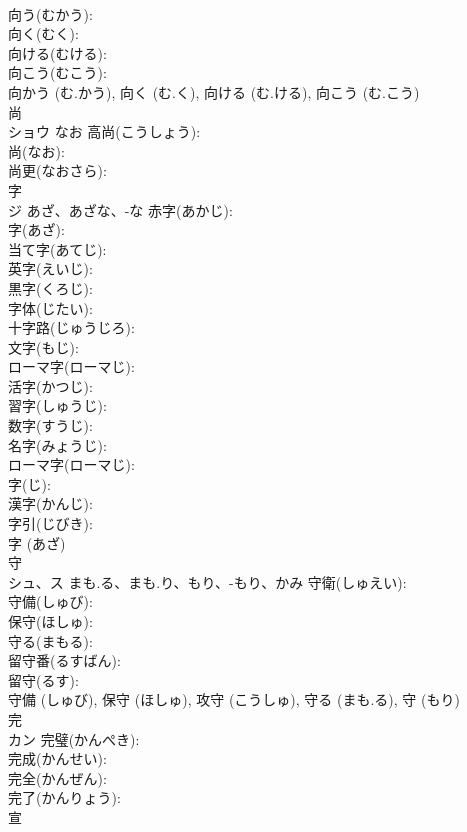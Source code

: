 \documentclass[8pt]{extreport}
\begin{document}
\begin{CJK}{UTF8}{min}
\\	向う(むかう): 
\\	向く(むく): 
\\	向ける(むける): 
\\	向こう(むこう): 
\\	向かう (む.かう), 向く (む.く), 向ける (む.ける), 向こう (む.こう)
\\	尚			
\\	ショウ	なお	高尚(こうしょう): 
\\	尚(なお): 
\\	尚更(なおさら): 
\\	字			
\\	ジ	あざ、あざな、-な	赤字(あかじ): 
\\	字(あざ): 
\\	当て字(あてじ): 
\\	英字(えいじ): 
\\	黒字(くろじ): 
\\	字体(じたい): 
\\	十字路(じゅうじろ): 
\\	文字(もじ): 
\\	ローマ字(ローマじ): 
\\	活字(かつじ): 
\\	習字(しゅうじ): 
\\	数字(すうじ): 
\\	名字(みょうじ): 
\\	ローマ字(ローマじ): 
\\	字(じ): 
\\	漢字(かんじ): 
\\	字引(じびき): 
\\	字 (あざ)
\\	守			
\\	シュ、ス	まも.る、まも.り、もり、-もり、かみ	守衛(しゅえい): 
\\	守備(しゅび): 
\\	保守(ほしゅ): 
\\	守る(まもる): 
\\	留守番(るすばん): 
\\	留守(るす): 
\\	守備 (しゅび), 保守 (ほしゅ), 攻守 (こうしゅ), 守る (まも.る), 守 (もり)
\\	完			
\\	カン		完璧(かんぺき): 
\\	完成(かんせい): 
\\	完全(かんぜん): 
\\	完了(かんりょう): 
\\	宣			

\end{CJK}
\end{document}
